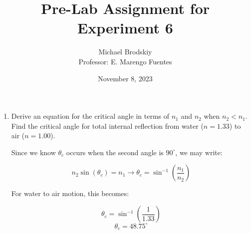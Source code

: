 


\title{Pre-Lab Assignment for Experiment 6}
\date{November 8, 2023}
\author{Michael Brodskiy\\ \small Professor: E. Marengo Fuentes}



\maketitle

\begin{enumerate}

  \item Derive an equation for the critical angle in terms of $n_1$ and $n_2$ when $n_2 < n_1$. Find the critical angle for total internal reflection from water ($n=1.33$) to air ($n=1.00$). 

    Since we know $\theta_c$ occurs when the second angle is $90^{\circ}$, we may write:

      $$n_2\sin(\theta_c)=n_1\longrightarrow \theta_c=\sin^{-1}\left(\frac{n_1}{n_2}\right)$$

    For water to air motion, this becomes:

    $$\theta_c=\sin^{-1}\left( \frac{1}{1.33} \right)$$
    $$\boxed{\theta_c=48.75^{\circ}}$$

\end{enumerate}



